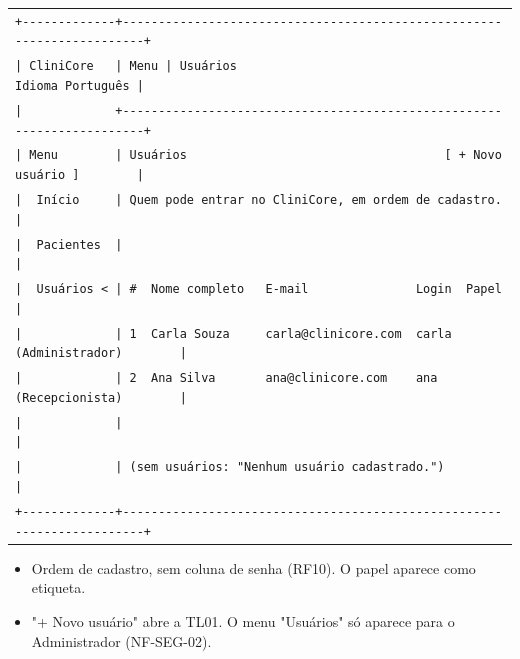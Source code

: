 \begin{center}

\begin{lrbox}{\interfaceWireframe}
\ttfamily\small
\begin{tabular}{@{}l@{}}
\verb`+-------------+-----------------------------------------------------------------------+` \\
\verb`| CliniCore   | Menu | Usuários                                      Idioma Português |` \\
\verb`|             +-----------------------------------------------------------------------+` \\
\verb`| Menu        | Usuários                                    [ + Novo usuário ]        |` \\
\verb`|  Início     | Quem pode entrar no CliniCore, em ordem de cadastro.                  |` \\
\verb`|  Pacientes  |                                                                       |` \\
\verb`|  Usuários < | #  Nome completo   E-mail               Login  Papel                  |` \\
\verb`|             | 1  Carla Souza     carla@clinicore.com  carla  (Administrador)        |` \\
\verb`|             | 2  Ana Silva       ana@clinicore.com    ana    (Recepcionista)        |` \\
\verb`|             |                                                                       |` \\
\verb`|             | (sem usuários: "Nenhum usuário cadastrado.")                          |` \\
\verb`+-------------+-----------------------------------------------------------------------+` \\
\end{tabular}
\end{lrbox}

\resizebox{\textwidth}{!}{\usebox{\interfaceWireframe}}

\end{center}

\begin{itemize}[leftmargin=*,itemsep=0.3em]

\item Ordem de cadastro, sem coluna de senha (RF10). O papel aparece como etiqueta.

\item "+ Novo usuário" abre a TL01. O menu "Usuários" só aparece para o Administrador (NF-SEG-02).

\end{itemize}

